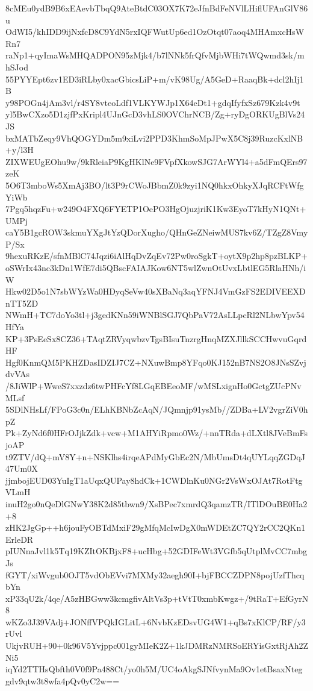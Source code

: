 8cMEu0ydB9B6xEAevbTbqQ9AteBtdC03OX7K72eJfnBdFeNVlLHiflUFAnGlV86u
OdWI5/khIDD9ijNxfcD8C9YdN5rxIQFWutUp6ed1OzOtqt07aoq4MHAmxcHsWRn7
raNp1+qyImaWsMHQADPON95zMjk4/b7lNNk5frQfvMjbWHi7tWQwmd3sk/mhSJod
55PYYEpt6zv1ED3iRLby0xacGbicsLiP+m/vK98Ug/A5GeD+RaaqBk+dcl2hIj1B
y98POGn4jAm3vl/r4SY8vteoLdf1VLKYWJp1X64eDt1+gdqIfyfxSz679Kzk4v9t
yl5BwCXzo5D1zjfPxKripl4UJnGcD3vhLS0OVChrNCB/Zg+ryDgORKUgBlVs24JS
bxMATbZeqy9VhQOGYDm5m9xiLvi2PPD3KhmSoMpJPwX5C8j39RuzcKxlNB+y/l3H
ZIXWEUgEOhu9w/9kRleiaP9KgHKlNe9FVpfXkowSJG7ArWYl4+a5dFmQErs97zeK
5O6T3mboWs5XmAj3BO/lt3P9rCWoJBbmZ0k9zyi1NQ0hkxOhkyXJqRCFtWfgYiWb
7Pgq5hqzFu+w249O4FXQ6FYETP1OePO3HgOjuzjriK1Kw3EyoT7kHyN1QNt+UMPj
caY5B1gcROW3skmuYXgJtYzQDorXugho/QHnGeZNeiwMUS7kv6Z/TZgZ8VmyP/Sx
9hexuRKzE/sfnMBlC74Jqzi6iAlHqDvZqEv72Pw0roSgkT+oytX9p2hp8pzBLKP+
oSWrIx43nc3kDn1WfE7di5QBscFAIAJKow6NT5wlZwnOtUvxLbtlEG5RlaHNh/iW
Hkw02D5o1N7sbWYzWa0HDyqSeVw40sXBaNq3aqYFNJ4VmGzFS2EDIVEEXDnTT5ZD
NWmH+TC7doYo3tl+j3gedKNn59iWNBlSGJ7QbPaV72AsLLpcRl2NLbwYpv54HfYa
KP+3PsEeSx8CZ36+TAqtZRVyqwbzvTgsBIsuTnzrgHnqMZXJllkSCCHwvuGqrdHF
Hgf0KnmQM5PKHZDasIDZIJ7CZ+NXuwBmp8YFqo0KJ152nB7NS2O8JNsSZvjdvVAs
/8JiWlP+WweS7xxzdz6twPHFcYf8LGqEBEeoMF/wMSLxignHo0GctgZUcPNvMLsf
5SDlNHsLf/FPoG3c0n/ELhKBNbZcAqN/JQmnjp91ysMb//ZDBa+LV2vgrZiV0hpZ
Pk+ZyNd6f0HFrOJjkZdk+vcw+M1AHYiRpmo0Wz/+nnTRda+dLXtl8JVeBmFsjoAP
t9ZTV/dQ+mV8Y+n+NSKlhs4irqeAPdMyGbEc2N/MbUmsDt4qUYLqqZGDqJ47Um0X
jjmbojEUD03YuIgT1aUqxQUPay8hdCk+1CWDlnKu0NGr2VsWxOJAt7RotFtgVLmH
inuH2go0nQeDlGNwY38K2d85tbwn9/XsBPec7xmrdQ3qamzTR/ITlDOuBE0Ha2+8
zHK2JgGp++h6jouFyOBTdMxiF29gMfqMcIwDgX0mWDEtZC7QY2rCC2QKn1ErleDR
pIUNnaJvl1k5Tq19KZItOKBjxF8+ucHbg+52GDIFeWt3VGfb5qUtplMvCC7mbgJs
fGYT/xiWvgub0OJT5vdObEVvi7MXMy32aegh90I+bjFBCCZDPN8pojUzfThcqbYn
xP33qU2k/4qe/A5zHBGww3kcmgfivAltVs3p+tVtT0xmbKwgz+/9tRaT+EfGyrN8
wKZo3J39VAdj+JONffVPQkIGLitL+6NvbKzEDsvUG4W1+qBs7xKlCP/RF/y3rUvl
UkjvRUH+90+0k96V5Yvjppc001gyMIeK2Z+1kJDMRzNMRSoERYisGxtRjAh2ZNi5
iqYd2TTHsQbfth0V0f9Pa488Ct/yo0h5M/UC4oAkgSJNfvynMa9Ov1etBsaxNteg
gdv9qtw3t8wfa4pQv0yC2w==
